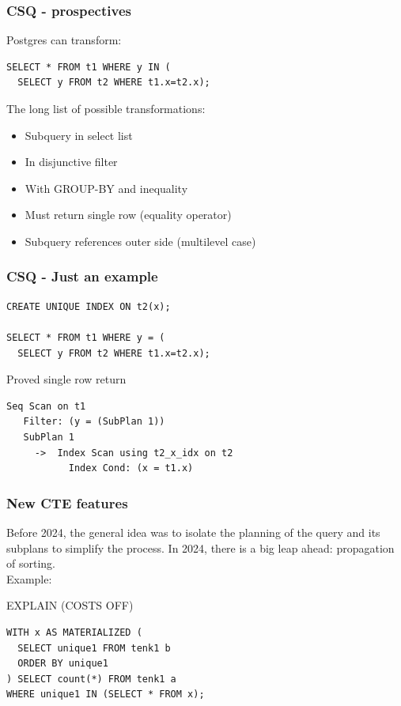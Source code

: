 \documentclass{beamer}
\begin{document}
\begin{frame}[fragile]\frametitle{CSQ - prospectives}
Postgres can transform:
\begin{lstlisting}
SELECT * FROM t1 WHERE y IN (
  SELECT y FROM t2 WHERE t1.x=t2.x);
\end{lstlisting}
The long list of possible transformations:
\begin{itemize}
  \item Subquery in select list
  \item In disjunctive filter
  \item With GROUP-BY and inequality
  \item Must return single row (equality operator)
  \item Subquery references outer side (multilevel case)
\end{itemize}
\end{frame}

\begin{frame}[fragile]\frametitle{CSQ - Just an example}
\begin{lstlisting}
CREATE UNIQUE INDEX ON t2(x);

SELECT * FROM t1 WHERE y = (
  SELECT y FROM t2 WHERE t1.x=t2.x);
\end{lstlisting}
\begin{block}{Proved single row return}
\begin{lstlisting}[basicstyle=\footnotesize]
 Seq Scan on t1
   Filter: (y = (SubPlan 1))
   SubPlan 1
     ->  Index Scan using t2_x_idx on t2
           Index Cond: (x = t1.x)
\end{lstlisting}\end{block}
\end{frame}

\begin{frame}[fragile]\frametitle{New CTE features}
Before 2024, the general idea was to isolate the planning of the query and its subplans to simplify the process. In 2024, there is a big leap ahead: propagation of sorting. \\ Example: \\
\begin{block}{EXPLAIN (COSTS OFF)}
\begin{lstlisting}
WITH x AS MATERIALIZED (
  SELECT unique1 FROM tenk1 b
  ORDER BY unique1
) SELECT count(*) FROM tenk1 a
WHERE unique1 IN (SELECT * FROM x);
\end{lstlisting}
\end{block}
\end{frame}
\end{document}
